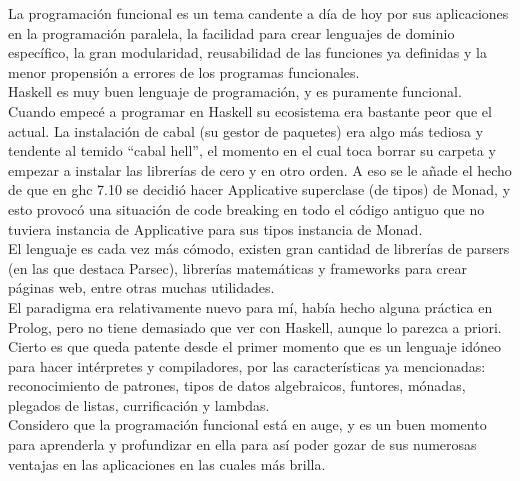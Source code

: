

La programaci\'on funcional es un tema candente a d\'ia de hoy por sus aplicaciones en la programaci\'on paralela, la facilidad para crear lenguajes de dominio espec\'ifico, la gran modularidad, reusabilidad de las funciones ya definidas y la menor propensi\'on a errores de los programas funcionales.\\

Haskell es muy buen lenguaje de programaci\'on, y es puramente funcional. Cuando empec\'e a programar en Haskell su ecosistema era bastante peor que el actual. La instalaci\'on de cabal (su gestor de paquetes) era algo m\'as tediosa y tendente al temido ``cabal hell'', el momento en el cual toca borrar su carpeta y empezar a instalar las librer\'ias de cero y en otro orden. A eso se le a\~{n}ade el hecho de que en ghc 7.10 se decidi\'o hacer Applicative superclase (de tipos) de Monad, y esto provoc\'o una situaci\'on de code breaking en todo el c\'odigo antiguo que no tuviera instancia de Applicative para sus tipos instancia de Monad.\\

El lenguaje es cada vez m\'as c\'omodo, existen gran cantidad de librer\'ias de parsers (en las que destaca Parsec), librer\'ias matem\'aticas y frameworks para crear p\'aginas web, entre otras muchas utilidades.\\

El paradigma era relativamente nuevo para m\'i, hab\'ia hecho alguna pr\'actica en Prolog, pero no tiene demasiado que ver con Haskell, aunque lo parezca a priori. Cierto es que queda patente desde el primer momento que es un lenguaje id\'oneo para hacer int\'erpretes y compiladores, por las caracter\'isticas ya mencionadas: reconocimiento de patrones, tipos de datos algebraicos, funtores, m\'onadas, plegados de listas, currificaci\'on y lambdas.\\

Considero que la programaci\'on funcional est\'a en auge, y es un buen momento para aprenderla y profundizar en ella para as\'i poder gozar de sus numerosas ventajas en las aplicaciones en las cuales m\'as brilla.